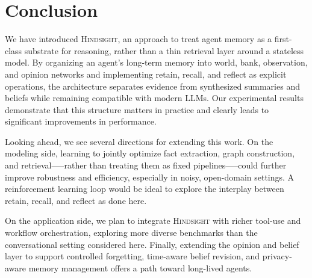 \documentclass{article} %
\theoremstyle{plain}
\theoremstyle{definition}
\newcommand{\our}{\textsc{Hindsight}\xspace}
\begin{document}
\doparttoc %
\faketableofcontents %

















\section{Conclusion}
We have introduced \our, an approach to treat agent memory as a first-class substrate for reasoning, rather than a thin retrieval layer around a stateless model. By organizing an agent’s long-term memory into world, bank, observation, and opinion networks and implementing retain, recall, and reflect as explicit operations, the architecture separates evidence from synthesized summaries and beliefs while remaining compatible with modern LLMs. Our experimental results demonstrate that this structure matters in practice and clearly leads to significant improvements in performance.

Looking ahead, we see several directions for extending this work. On the modeling side, learning to jointly optimize fact extraction, graph construction, and retrieval—--rather than treating them as fixed pipelines—--could further improve robustness and efficiency, especially in noisy, open-domain settings. A reinforcement learning loop would be ideal to explore the interplay between retain, recall, and reflect as done here.

On the application side, we plan to integrate \our with richer tool-use and workflow orchestration, exploring more diverse benchmarks than the conversational setting considered here.
Finally, extending the opinion and belief layer to support controlled forgetting, time-aware belief revision, and privacy-aware memory management offers a path toward long-lived agents.





\clearpage


\end{document}
